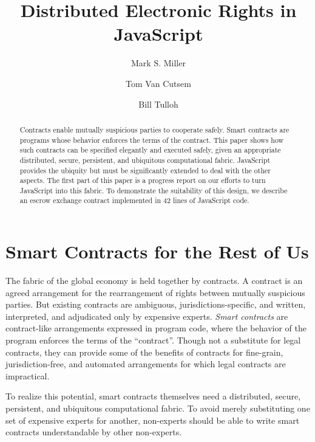 \documentclass{llncs}
\begin{document}
\sloppypar


\title{Distributed Electronic Rights in JavaScript}

\author{Mark S. Miller \and Tom Van Cutsem \and Bill Tulloh }


\maketitle    

\begin{abstract}
Contracts enable mutually suspicious parties to cooperate safely. Smart contracts are programs whose behavior enforces the terms of the contract. This paper shows how such contracts can be specified elegantly and executed safely, given an appropriate distributed, secure, persistent, and ubiquitous computational fabric. JavaScript provides the ubiquity but must be significantly extended to deal with the other aspects. The first part of this paper is a progress report on our efforts to turn JavaScript into this fabric. To demonstrate the suitability of this design, we describe an escrow exchange contract implemented in 42 lines of JavaScript code.

\end{abstract}


\section{Smart Contracts for the Rest of Us}
\label{intro}

The fabric of the global economy is held together by contracts. A contract is an agreed arrangement for the rearrangement of rights between mutually suspicious parties. But existing contracts are ambiguous, jurisdictions-specific, and written, interpreted, and adjudicated only by expensive experts. \emph{Smart contracts} are contract-like arrangements expressed in program code, where the behavior of the program enforces the terms of the ``contract''\cite{szabo1997formalizing}. Though not a substitute for legal contracts, they can provide some of the benefits of contracts for fine-grain, jurisdiction-free, and automated arrangements for which legal contracts are impractical.

To realize this potential, smart contracts themselves need a distributed, secure, persistent, and ubiquitous computational fabric. To avoid merely substituting one set of expensive experts for another, non-experts should be able to write smart contracts understandable by other non-experts.
\end{document}
